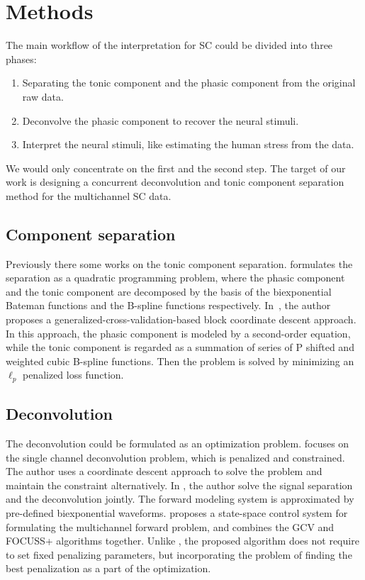\documentclass[10pt,conference]{ieeeconf}
\begin{document}
\section{Methods}

The main workflow of the interpretation for SC could be divided into three phases:

\begin{enumerate}
  \item Separating the tonic component and the phasic component from the original raw data.
  \item Deconvolve the phasic component to recover the neural stimuli.
  \item Interpret the neural stimuli, like estimating the human stress from the data.
\end{enumerate}

We would only concentrate on the first and the second step. The target of our work is designing a concurrent deconvolution and tonic component separation method for the multichannel SC data.

\subsection{Component separation}

Previously there some works on the tonic component separation. \cite{greco2014electrodermal} formulates the separation as a quadratic programming problem, where the phasic component and the tonic component are decomposed by the basis of the biexponential Bateman functions and the B-spline functions respectively. In~\cite{amin2019tonic}, the author proposes a generalized-cross-validation-based block coordinate descent approach. In this approach, the phasic component is modeled by a second-order equation, while the tonic component is regarded as a summation of series of P shifted and weighted cubic B-spline functions. Then the problem is solved by minimizing an $\ell_p$ penalized loss function.

\subsection{Deconvolution}

The deconvolution could be formulated as an optimization problem. \cite{wickramasuriya2019skin} focuses on the single channel deconvolution problem, which is penalized and constrained. The author uses a coordinate descent approach to solve the problem and maintain the constraint alternatively. In \cite{hernando2017feature}, the author solve the signal separation and the deconvolution jointly. The forward modeling system is approximated by pre-defined biexponential waveforms. \cite{amin2019robust} proposes a state-space control system for formulating the multichannel forward problem, and combines the GCV and FOCUSS+ algorithms together. Unlike \cite{amin2019tonic}, the proposed algorithm does not require to set fixed penalizing parameters, but incorporating the problem of finding the best penalization as a part of the optimization.
\end{document}
